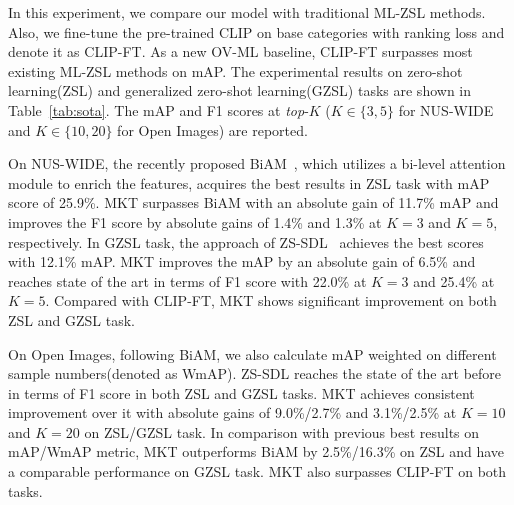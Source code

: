 \documentclass[letterpaper]{article} %
\begin{document}
In this experiment, we compare our model with traditional ML-ZSL methods. 
Also, we fine-tune the pre-trained CLIP on base categories with ranking loss and denote it as CLIP-FT. 
As a new OV-ML baseline, CLIP-FT surpasses most existing ML-ZSL methods on mAP.
The experimental results on zero-shot learning(ZSL) and generalized zero-shot learning(GZSL) tasks are shown in Table~\ref{tab:sota}. 
The mAP and F1 scores at \textit{top}-$K$ ($K\in\{3,5\}$ for NUS-WIDE and
$K\in\{10,20\}$ for Open Images) are reported. 

On NUS-WIDE, the recently proposed BiAM~\cite{biam}, which utilizes a bi-level attention module to enrich the features, acquires the best results in ZSL task with mAP score of 25.9\%. 
MKT surpasses BiAM with an absolute gain of 11.7\% mAP and improves the F1 score by absolute gains of 1.4\% and 1.3\% at $K {=} 3$ and $K {=} 5$, respectively. 
In GZSL task, the approach of ZS-SDL~\cite{zssdl} achieves the best scores with 12.1\% mAP. 
MKT improves the mAP by an absolute gain of 6.5\% and reaches state of the art in terms of F1 score with 22.0\% at $K {=} 3$ and 25.4\% at $K {=} 5$.
Compared with CLIP-FT, MKT shows significant improvement on both ZSL and GZSL task.

On Open Images, following BiAM, we also calculate mAP weighted on different sample numbers(denoted as WmAP).
ZS-SDL reaches the state of the art before in terms of F1 score in both ZSL and GZSL tasks. 
MKT achieves consistent improvement over it with absolute gains of 9.0\%/2.7\% and 3.1\%/2.5\% at $K {=} 10$ and $K {=} 20$ on ZSL/GZSL task. 
In comparison with previous best results on mAP/WmAP metric, MKT outperforms BiAM by 2.5\%/16.3\% on ZSL and have a comparable performance on GZSL task. 
MKT also surpasses CLIP-FT on both tasks.




\end{document}

